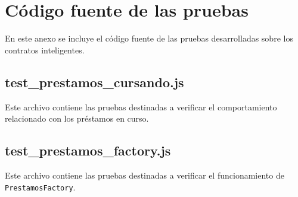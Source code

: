 \chapter{Código fuente de las pruebas}
\label{anexo:mochatest}

En este anexo se incluye el código fuente de  las pruebas desarrolladas sobre los contratos inteligentes.



\section{test\_prestamos\_cursando.js}

Este archivo contiene las pruebas destinadas a verificar el comportamiento relacionado con los préstamos en curso.




\section{test\_prestamos\_factory.js}

Este archivo contiene las pruebas destinadas a verificar el funcionamiento de \texttt{PrestamosFactory}.


